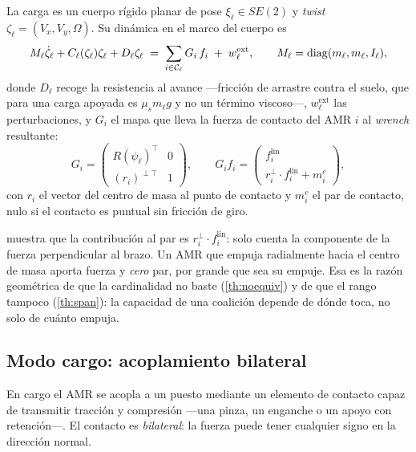 La carga es un cuerpo rígido planar de pose $\xi_\ell\in SE(2)$ y \emph{twist}
$\zeta_\ell=(V_x,V_y,\Omega)$. Su dinámica en el marco del cuerpo es
\begin{equation}
  M_\ell\dot\zeta_\ell+C_\ell(\zeta_\ell)\zeta_\ell+D_\ell\zeta_\ell
  \;=\;\sum_{i\in\mathcal{C}_\ell}G_{i}\,f_i\;+\;w^{\mathrm{ext}}_\ell,
  \qquad
  M_\ell=\operatorname{diag}(m_\ell,m_\ell,I_\ell),
  \label{eq:carga-dinamica}
\end{equation}
donde $D_\ell$ recoge la resistencia al avance —fricción de arrastre contra el
suelo, que para una carga apoyada es $\mu_s m_\ell g$ y no un término viscoso—,
$w^{\mathrm{ext}}_\ell$ las perturbaciones, y $G_i$ el mapa que lleva la fuerza
de contacto del AMR $i$ al \emph{wrench} resultante:
\begin{equation}
  G_i=\begin{pmatrix} R(\psi_\ell)^{\!\top} & 0\\[2pt] (r_i)^{\perp\top} & 1\end{pmatrix},
  \qquad
  G_i f_i=\begin{pmatrix} f_i^{\mathrm{lin}}\\ r_i^{\perp}\!\cdot f_i^{\mathrm{lin}}+m_i^{c}\end{pmatrix},
  \label{eq:mapa-contacto}
\end{equation}
con $r_i$ el vector del centro de masa al punto de contacto y $m^c_i$ el par de
contacto, nulo si el contacto es puntual sin fricción de giro.

\begin{observacion}
\label{obs:brazo}
 muestra que la contribución al par es
$r_i^{\perp}\!\cdot f_i^{\mathrm{lin}}$: solo cuenta la componente de la fuerza
perpendicular al brazo. Un AMR que empuja radialmente hacia el centro de masa
aporta fuerza y \emph{cero} par, por grande que sea su empuje. Esa es la razón
geométrica de que la cardinalidad no baste (\cref{th:noequiv}) y de que el rango
tampoco (\cref{th:span}): la capacidad de una coalición depende de dónde toca,
no solo de cuánto empuja.
\end{observacion}

\subsection{Modo \textsf{cargo}: acoplamiento bilateral}

En \textsf{cargo} el AMR se acopla a un puesto mediante un elemento de contacto
capaz de transmitir tracción y compresión —una pinza, un enganche o un apoyo con
retención—. El contacto es \emph{bilateral}: la fuerza puede tener cualquier
signo en la dirección normal.

